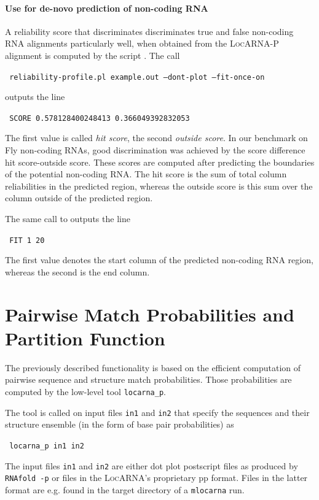 \documentclass{article}
\newcommand{\LocARNA}{\textsc{LocARNA}}
\newcommand{\LocARNAP}{\textsc{LocARNA-P}}
\newenvironment{ttbox}{%
  \begin{framed}\begin{minipage}{1.0\textwidth}\tt}%
{\end{minipage}\end{framed}}
\begin{document}
\paragraph{Use for de-novo prediction of non-coding RNA}
A reliability score that discriminates discriminates true and false
non-coding RNA alignments particularly well, when obtained from the
\LocARNAP{} alignment is computed by the script
.  The call
\begin{ttbox}
  reliability-profile.pl example.out --dont-plot --fit-once-on
\end{ttbox}
outputs the line
\begin{ttbox}
  SCORE 0.578128400248413 0.366049392832053
\end{ttbox}
The first value is called \emph{hit score}, the second \emph{outside
  score}. In our benchmark on Fly non-coding RNAs, good discrimination
was achieved by the score difference hit score-outside score. These
scores are computed after predicting the boundaries of the potential
non-coding RNA. The hit score is the sum of total column reliabilities
in the predicted region, whereas the outside score is this sum over
the column outside of the predicted region.

The same call to  outputs the line
\begin{ttbox}
  FIT 1 20
\end{ttbox}
The first value denotes the start column of the predicted non-coding
RNA region, whereas the second is the end column.

\section{Pairwise Match Probabilities and Partition Function}

The previously described functionality is based on the efficient
computation of pairwise sequence and structure match probabilities.
Those probabilities are computed by the low-level tool
\texttt{locarna\_p}.

The tool is called on input files \texttt{in1} and \texttt{in2} that
specify the sequences and their structure ensemble (in the form of
base pair probabilities) as
\begin{ttbox}
  locarna\_p in1 in2
\end{ttbox}
\noindent
The input files \texttt{in1} and \texttt{in2} are either dot plot
postscript files as produced by \texttt{RNAfold -p} or files in the
\LocARNA{}'s proprietary pp format. Files in the latter format are
e.g. found in the target directory of a \texttt{mlocarna} run.
\end{document}
